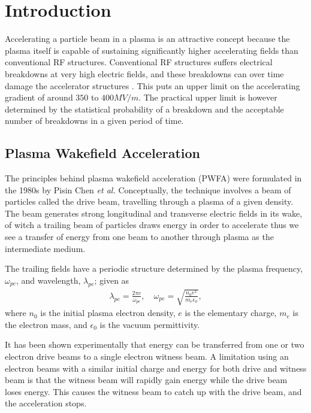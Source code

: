 %
%

\chapter{Introduction}
\label{Ch:Intro}

Accelerating a particle beam in a plasma is an attractive concept because the plasma itself is
capable of sustaining significantly higher accelerating fields than conventional RF structures.
Conventional RF structures suffers electrical breakdowns at very high electric fields, and these
breakdowns can over time damage the accelerator structures \cite{braun:2003}. This puts an upper
limit on the accelerating gradient of around $350$ to $400\unit{MV/m}$. The practical upper limit is
however determined by the statistical probability of a breakdown and the acceptable number of
breakdowns in a given period of time.\cite{pritzkau:2002} 

\section{Plasma Wakefield Acceleration}
\label{Int:PWFA}

The principles behind plasma wakefield acceleration (PWFA) were formulated in the 1980s by Pisin
Chen \emph{et al.} \cite{chen:1985} Conceptually, the technique involves a beam of particles called
the drive beam, travelling through a plasma of a given density. The beam generates strong
longitudinal and transverse electric fields in its wake, of witch a trailing beam of particles draws
energy in order to accelerate \dash thus we see a transfer of energy from one beam to another
through plasma as the intermediate medium.

The trailing fields have a periodic structure determined by the plasma frequency, $\omega_{pe}$, and
wavelength, $\lambda_{pe}$; given as \begin{align} \lambda_{pe} = \frac{2\pi c}{\omega_{pe}}, \quad
\omega_{pe} = \sqrt{\frac{n_{0}e^{2}}{m_{e}\epsilon_{0}}}, \label{EQ:PWFA:L0W0} \end{align} where
$n_{0}$ is the initial plasma electron density, $e$ is the elementary charge, $m_{e}$ is the
electron mass, and $\epsilon_{0}$ is the vacuum permittivity.

It has been shown experimentally that energy can be transferred from one or two electron drive beams
to a single electron witness beam.\cite{rosenzweig:1988, blumenfeld:2007, kallos:2008} A limitation
using an electron beams with a similar initial charge and energy for both drive and witness beam is
that the witness beam will rapidly gain energy while the drive beam loses energy. This causes the
witness beam to catch up with the drive beam, and the acceleration stops. 

